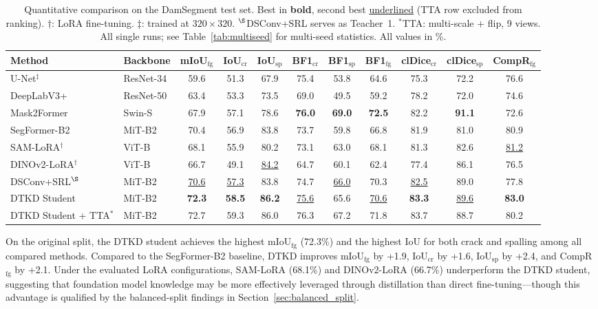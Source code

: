 \documentclass[review,authoryear]{elsarticle}
\begin{document}
\begin{table}[t]
\centering
\caption{Quantitative comparison on the DamSegment test set. Best in \textbf{bold}, second best \underline{underlined} (TTA row excluded from ranking). $\dagger$: LoRA fine-tuning. $\ddagger$: trained at $320{\times}320$. $^\S$DSConv+SRL serves as Teacher~1. $^*$TTA: multi-scale + flip, 9 views. All single runs; see Table~\ref{tab:multiseed} for multi-seed statistics. All values in \%.}
\label{tab:main}
\begin{tabular}{llccccccccc}
\toprule
Method & Backbone & mIoU$_{\text{fg}}$ & IoU$_{\text{cr}}$ & IoU$_{\text{sp}}$ & BF1$_{\text{cr}}$ & BF1$_{\text{sp}}$ & BF1$_{\text{fg}}$ & clDice$_{\text{cr}}$ & clDice$_{\text{sp}}$ & CompR$_{\text{fg}}$ \\
\midrule
U-Net$^\ddagger$ \citep{ronneberger2015unet} & ResNet-34 & 59.6 & 51.3 & 67.9 & 75.4 & 53.8 & 64.6 & 75.3 & 72.2 & 76.6 \\
DeepLabV3+ \citep{chen2018deeplabv3p} & ResNet-50 & 63.4 & 53.3 & 73.5 & 69.0 & 49.5 & 59.2 & 78.2 & 72.0 & 74.6 \\
Mask2Former \citep{cheng2022mask2former} & Swin-S & 67.9 & 57.1 & 78.6 & \textbf{76.0} & \textbf{69.0} & \textbf{72.5} & 82.2 & \textbf{91.1} & 72.6 \\
SegFormer-B2 \citep{xie2021segformer} & MiT-B2 & 70.4 & 56.9 & 83.8 & 73.7 & 59.8 & 66.8 & 81.9 & 81.0 & 80.9 \\
SAM-LoRA$^\dagger$ \citep{kirillov2023sam} & ViT-B & 68.1 & 55.9 & 80.2 & 73.1 & 63.0 & 68.1 & 81.3 & 82.6 & \underline{81.2} \\
DINOv2-LoRA$^\dagger$ \citep{oquab2024dinov2} & ViT-B & 66.7 & 49.1 & \underline{84.2} & 64.7 & 60.1 & 62.4 & 77.4 & 86.1 & 76.5 \\
\midrule
DSConv+SRL$^\S$ & MiT-B2 & \underline{70.6} & \underline{57.3} & 83.8 & 74.7 & \underline{66.0} & 70.3 & \underline{82.5} & 89.0 & 77.8 \\
DTKD Student & MiT-B2 & \textbf{72.3} & \textbf{58.5} & \textbf{86.2} & \underline{75.6} & 65.6 & \underline{70.6} & \textbf{83.3} & \underline{89.6} & \textbf{83.0} \\
\midrule
DTKD Student + TTA$^*$ & MiT-B2 & 72.7 & 59.3 & 86.0 & 76.3 & 67.2 & 71.8 & 83.7 & 88.7 & 80.2 \\
\bottomrule
\end{tabular}
\end{table}

On the original split, the DTKD student achieves the highest mIoU$_{\text{fg}}$ (72.3\%) and the highest IoU for both crack and spalling among all compared methods.
Compared to the SegFormer-B2 baseline, DTKD improves mIoU$_{\text{fg}}$ by +1.9, IoU$_{\text{cr}}$ by +1.6, IoU$_{\text{sp}}$ by +2.4, and CompR$_{\text{fg}}$ by +2.1.
Under the evaluated LoRA configurations, SAM-LoRA (68.1\%) and DINOv2-LoRA (66.7\%) underperform the DTKD student, suggesting that foundation model knowledge may be more effectively leveraged through distillation than direct fine-tuning---though this advantage is qualified by the balanced-split findings in Section~\ref{sec:balanced_split}.
\end{document}
